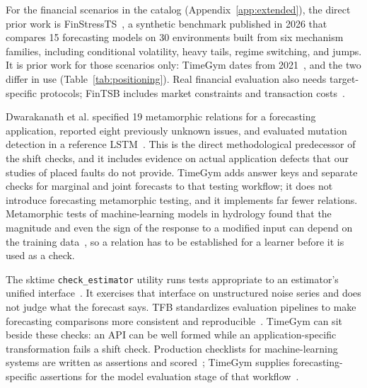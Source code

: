 \documentclass[11pt,a4paper]{article}
\newcommand{\code}[1]{\texttt{#1}}
\begin{document}
For the financial scenarios in the catalog
(Appendix~\ref{app:extended}), the direct prior work is
FinStressTS~\cite{sun2026finstressts}, a synthetic benchmark published in
2026 that compares 15 forecasting models on 30 environments built from
six mechanism families, including conditional volatility, heavy tails,
regime switching, and jumps. It is prior work for those scenarios only:
TimeGym dates from 2021~\cite{seca2021timegym}, and the two differ in use
(Table~\ref{tab:positioning}). Real financial evaluation
also needs target-specific protocols; FinTSB includes market constraints
and transaction costs~\cite{hu2026fintsb}.

Dwarakanath et al. specified 19 metamorphic relations for a forecasting
application, reported eight previously unknown issues, and evaluated
mutation detection in a reference LSTM~\cite{dwarakanath2019metamorphic}.
This is the direct methodological predecessor of the shift checks, and it
includes evidence on actual application defects that our studies of
placed faults do not provide. TimeGym adds answer keys and separate
checks for marginal and joint forecasts to that testing workflow; it does
not introduce forecasting metamorphic testing, and it implements far
fewer relations.
Metamorphic tests of machine-learning models in hydrology found that the
magnitude and even the sign of the response to a modified input can
depend on the training data~\cite{reichert2024metamorphic}, so a relation
has to be established for a learner before it is used as a check.

The sktime
\code{check\_estimator} utility runs tests appropriate to an estimator's
unified interface~\cite{sktimeConformance}. It exercises that interface
on unstructured noise series and does not judge what the forecast says.
TFB standardizes evaluation pipelines to make forecasting comparisons
more consistent and reproducible~\cite{qiu2024tfb}. TimeGym can sit beside
these checks: an API can be well formed while an application-specific
transformation fails a shift check.
Production checklists for machine-learning systems are written as
assertions and scored~\cite{breck2017test}; TimeGym supplies
forecasting-specific assertions for the model evaluation stage of that
workflow~\cite{amershi2019software}.
\end{document}
